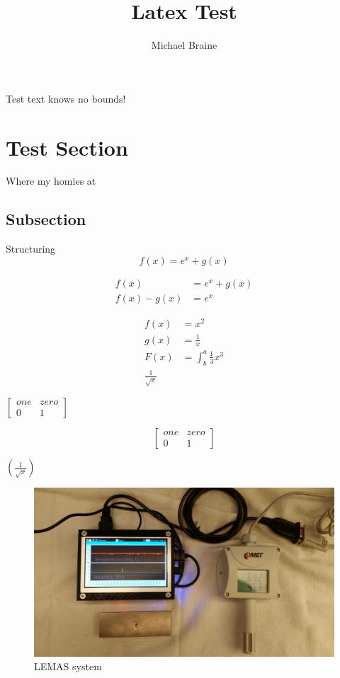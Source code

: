 \documentclass{article}
\title{Latex Test}
\author{Michael Braine}
\begin{document}
  \maketitle
  \tableofcontents
  \listoffigures
  \newpage
  Test text knows no bounds!
  \section{Test Section}
  Where my homies at
  \subsection{Subsection}
  Structuring
  \begin{equation}
    f(x) = e^x + g(x)
  \end{equation}

  \begin{align*}
    f(x) &= e^x + g(x)\\
    f(x) - g(x) &= e^x
  \end{align*}

  \begin{align*}
    f(x) &= x^2\\
    g(x) &= \frac{1}{x}\\
    F(x) &= \int^a_b \frac{1}{3}x^3\\
    \frac{1}{\sqrt{x}}
  \end{align*}

  $\left[
    \begin{matrix}
      one & zero\\
      0 & 1
    \end{matrix}
  \right]$

  \begin{equation}
    \left[
      \begin{matrix}
        one & zero\\
        0 & 1
      \end{matrix}
    \right]
  \end{equation}

  $\left(\frac{1}{\sqrt{x}}\right)$

  \begin{figure}
    \includegraphics[width=\linewidth]{figures/index.jpeg}
    \caption{LEMAS system}
    \label{fig:LEMAS}
  \end{figure}
\end{document}
